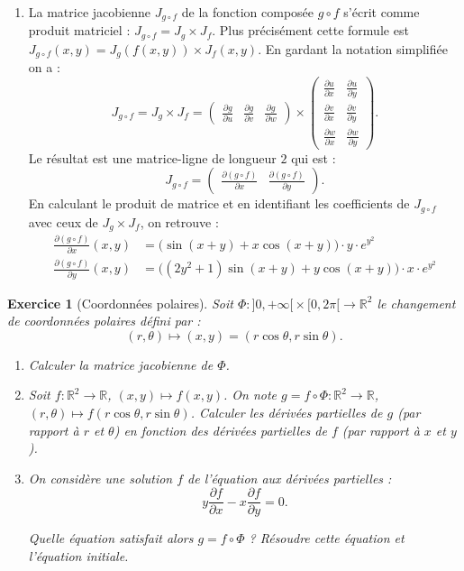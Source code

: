 \documentclass[11pt,a4paper]{article}
\newcommand{\Rr}{\mathbb{R}} \newcommand{\R}{\mathbb{R}}
\theoremstyle{exostyle}
\newtheorem{exo}{Exercice}
\newcommand{\exercice}[1]{} \newcommand{\finexercice}{}
\newcommand{\enonce}{\begin{exo}} \newcommand{\finenonce}{\end{exo}}
\begin{document}
\begin{enumerate}
	\item La matrice jacobienne $J_{g\circ f}$ de la fonction
	composée  $g\circ f$ s'écrit comme produit matriciel : \og{}$J_{g\circ f} = J_g \times J_f$\fg{}.
	Plus précisément cette formule est $J_{g\circ f} (x,y) = J_g (f(x,y)) \times J_f(x,y)$.
	En gardant la notation simplifiée on a :
	\[
	J_{g\circ f}
	= J_g \times J_f 
	= \begin{pmatrix}
		\frac{\partial g}{\partial u} & \frac{\partial g}{\partial v} & \frac{\partial g}{\partial w} \end{pmatrix}
		\times 
		\begin{pmatrix} 
		\frac{\partial u}{\partial x}
		&
		\frac{\partial u}{\partial y}
		\\
		\frac{\partial v}{\partial x}
		&
		\frac{\partial v}{\partial y}
		\\
		\frac{\partial w}{\partial x}
		&
		\frac{\partial w}{\partial y}
	\end{pmatrix}.
	\]
	Le résultat est une matrice-ligne de longueur $2$ qui est :
	\[ J_{g\circ f} = \begin{pmatrix} 
		\frac{\partial (g \circ f)}{\partial x} & \frac{\partial (g \circ f)}{\partial y}
		\end{pmatrix}.
	\]
	En calculant le produit de matrice et en identifiant les coefficients de $J_{g\circ f}$ avec ceux de $J_g \times J_f$, on retrouve :
\begin{align*}
	\frac{\partial (g \circ f)}{\partial x}(x,y)
	&= 
	\big(\sin(x + y) + x \cos(x + y) \big) \cdot y \cdot  e^{y^2}
	\\
	\frac{\partial (g\circ f)}{\partial y}(x,y)
	&=
	\big((2y^2+1)\sin(x + y) + y \cos(x + y) \big) \cdot x \cdot  e^{y^2}
\end{align*}
\end{enumerate}
\fincorrection
\finexercice

\exercice{}
\enonce[Coordonnées polaires]
Soit $\Phi : {}]0,+\infty[{}\times{}[0,2\pi[{}\rightarrow \Rr^2$ le changement de coordonnées polaires défini par :
$$(r,\theta)\longmapsto (x,y) = (r\cos\theta,r\sin\theta).$$
\begin{enumerate}
	\item Calculer la matrice jacobienne de $\Phi$.
	
	\item Soit $f : \Rr^2 \to \Rr$, $(x,y) \mapsto f(x,y)$. 
	On note $g = f \circ \Phi : \Rr^2 \to \Rr$, $(r,\theta) \mapsto f(r\cos\theta, r \sin\theta)$. 
	Calculer les dérivées partielles de $g$ (par rapport à $r$ et $\theta$) en fonction des dérivées partielles de $f$ (par rapport à $x$ et $y$).
	
	\item On considère une solution $f$ de l'équation aux dérivées partielles :
	$$y \frac{\partial f}{\partial x}- x\frac{\partial f}{\partial y}=0.$$
	
	Quelle équation satisfait alors $g = f \circ \Phi$ ?
	Résoudre cette équation et l'équation initiale.
	
\end{enumerate}
\finenonce
\end{document}
